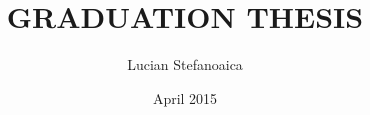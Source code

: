 \documentclass[a4paper,12pt]{book}
\begin{document}
\author{Lucian Stefanoaica}
\title{GRADUATION THESIS}
\date{April 2015}

\frontmatter
\maketitle
\tableofcontents

\mainmatter



\backmatter
\end{document}
